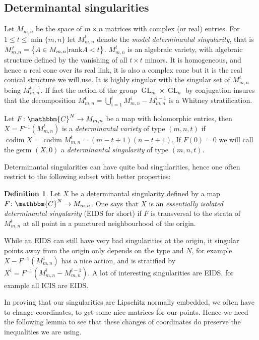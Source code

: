 \documentclass[a4paper,oneside]{amsart}
\theoremstyle{definition}
\newtheorem{defn}[thm]{Definition}
\begin{document}
\subsection*{Determinantal singularities}

Let $M_{m,n}$ be the space of $m\times n$ matrices with complex (or
real) entries. For $1\leq t\leq \min \{ m,n \}$ let ${M^{ {t} }_{m,n}}$ denote the
\emph{model determinantal
  singularity}, that is ${M^{ {t} }_{m,n}} = \big{\{} A\in M_{m,n} \vert {\operatorname{rank}} A <
  t \big{\}}$. ${M^{ {t} }_{m,n}}$ is an algebraic variety, with algebraic
  structure defined by the vanishing of all $t\times t$ minors. It is
  homogeneous, and hence a real cone over its real link, it is also
  a complex cone but it is the real conical structure we will use.  
It is highly singular with the singular set of ${M^{ {t} }_{m,n}}$ being
${M^{ {t-1} }_{m,n}}$. If fact the action of the group ${\operatorname{GL}}_m\times{\operatorname{GL}}_n$ by
conjugation insures that the decomposition ${M^{ {t} }_{m,n}} = \bigcup_{i=1}^t
{M^{ {i} }_{m,n}}-{M^{ {i-1} }_{m,n}}$ is a Whitney stratification.   

Let ${ {F} \colon {{\mathbbm{C}}^N} \to {M_{m,n}}}$ be a map with holomorphic entries, then
  $X=F{^{-1}} ({M^{ {t} }_{m,n}})$ is a \emph{determinantal variety} of type
  $(m,n,t)$ if ${\operatorname{codim}} X = {\operatorname{codim}}
  {M^{ {t} }_{m,n}} = (m-t+1)(n-t+1)$. If $F(0)= 0$ we will call the germ $(X,0)$
  a \emph{determinantal singularity} of type $(m,n,t)$.

Determinantal singularities can have quite bad singularities, hence one
often restrict to the following subset with better properties:
\begin{defn}
Let $X$ be a determinantal singularity defined by a map
${ {F} \colon {{\mathbbm{C}}^N} \to {M_{m,n}}}$. One says that $X$ is an \emph{essentially
  isolated determinantal singularity} (EIDS for short) if $F$ is
transversal to the strata of ${M^{ {t} }_{m,n}}$ at all point in a punctured
neighbourhood of the origin.
\end{defn}
While an EIDS can still have very bad singularities at the origin, it
singular points away from the origin only depends on the type and $N$,
for example $X-F{^{-1}}({M^{ {1} }_{m,n}})$ has a nice action, and is stratified by
$X^i= F{^{-1}}({M^{ {i} }_{m,n}}- {M^{ {i-1} }_{m,n}})$. A lot of interesting singularities are
EIDS, for example all ICIS are EIDS.

In proving that our singularities are Lipschitz normally embedded,
we often have to change coordinates, to get some nice matrices for our
points. Hence we need the following lemma to see that these changes of
coordinates do preserve the inequalities we are using.
\end{document}
